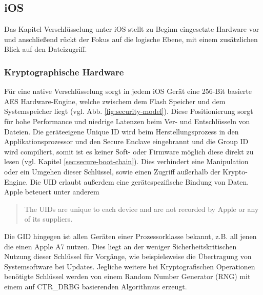 \subsection{iOS}
	Das Kapitel Verschlüsselung unter iOS stellt zu Beginn eingesetzte Hardware vor
	und anschließend rückt der Fokus auf die logische Ebene, mit einem zusätzlichen
	Blick auf den Dateizugriff.
	\subsubsection{Kryptographische Hardware}\label{sec:crypto-engine}
		Für eine native Verschlüsselung sorgt in jedem iOS Gerät eine 256-Bit
		basierte AES Hardware-Engine, welche zwischem dem Flash	Speicher und dem
		Systemspeicher liegt (vgl. Abb. \ref{fig:security-model}). Diese
		Positionierung sorgt für hohe Performance und niedrige Latenzen beim
		Ver- und Entschlüsseln von Dateien. Die geräteeigene Unique ID wird beim
		Herstellungsprozess in den Applikationsprozessor und den Secure Enclave
		eingebrannt und die Group ID wird compiliert, somit ist es keiner Soft- oder
		Firmware möglich diese direkt zu lesen (vgl. Kapitel
		\ref{sec:secure-boot-chain}). Dies verhindert eine Manipulation oder ein
		Umgehen dieser Schlüssel, sowie einen Zugriff außerhalb der Krypto-Engine.
		Die UID erlaubt außerdem eine gerätespezifische Bindung von Daten. Apple
		beteuert unter anderem
		\begin{quote}
			The UIDs are unique to each device and are not recorded by Apple or any of its
			suppliers.\cite[S.9]{iOSSecurityApr2015}
		\end{quote}
		Die GID hingegen ist allen Geräten einer
		Prozessorklasse bekannt, z.B.
		all jenen die einen Apple A7 nutzen. Dies liegt an der weniger
		Sicherheitskritischen Nutzung dieser Schlüssel für Vorgänge,
		wie beispielsweise die Übertragung von Systemsoftware bei Updates. Jegliche
		weitere bei Kryptografischen Operationen benötigte Schlüssel werden von einem
		Random Number Generator (RNG) mit einem auf	CTR\_DRBG\cite{NISTDRBG2012}
		basierenden Algorithmus erzeugt.
